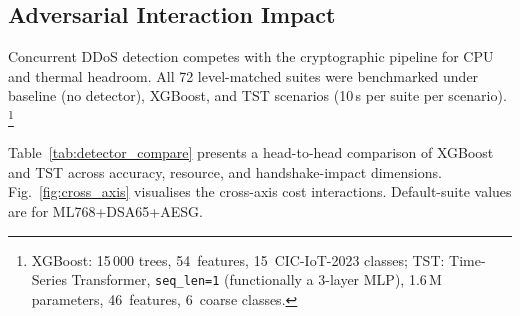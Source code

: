 \subsection{Adversarial Interaction Impact}
\label{sec:ddos}

Concurrent DDoS detection competes with the cryptographic pipeline
for CPU and thermal headroom.  All 72 level-matched suites were
benchmarked under baseline (no detector), XGBoost, and TST scenarios
(10\,s per suite per scenario).%
\footnote{XGBoost: 15\,000 trees, 54~features, 15~CIC-IoT-2023
  classes; TST: Time-Series Transformer, \texttt{seq\_len=1}
  (functionally a 3-layer MLP), 1.6\,M parameters, 46~features,
  6~coarse classes.}

Table~\ref{tab:detector_compare} presents a head-to-head comparison
of XGBoost and TST across accuracy, resource, and handshake-impact
dimensions.  Fig.~\ref{fig:cross_axis} visualises the cross-axis
cost interactions.  Default-suite values are for ML768+DSA65+AESG.

